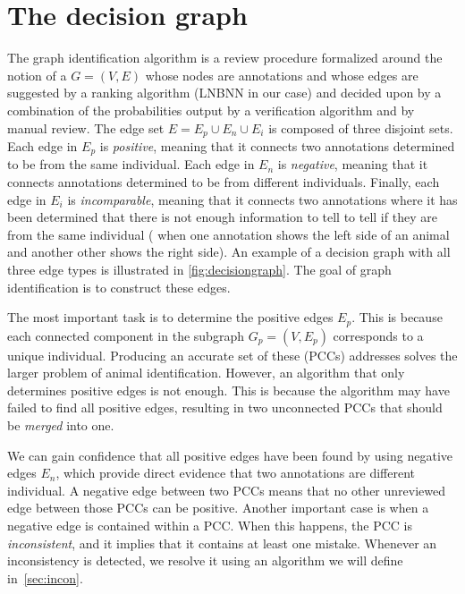 \section{The decision graph}\label{sec:decisiongraph}

\decisiongraph{}

The graph identification algorithm is a review procedure formalized around the notion of a  $G = (V, E)$ whose nodes are annotations and whose edges are suggested by a ranking algorithm (LNBNN in our
case) and decided upon by a combination of the probabilities output by a verification algorithm and by manual
review.  The edge set $E = E_p \cup E_n \cup E_i$ is composed of three disjoint sets. Each edge in $E_p$ is
\emph{positive}, meaning that it connects two annotations determined to be from the same individual. Each edge in
$E_n$ is \emph{negative}, meaning that it connects annotations determined to be from different individuals.
Finally, each edge in $E_i$ is \emph{incomparable}, meaning that it connects two annotations where it has been
determined that there is not enough information to tell to tell if they are from the same individual (\eg{} when
one annotation shows the left side of an animal and another other shows the right side).  An example of a decision
graph with all three edge types is illustrated in \cref{fig:decisiongraph}. The goal of graph identification is to
construct these edges.

The most important task is to determine the positive edges $E_p$.  This is because each connected component in the
subgraph $G_p = (V, E_p)$ corresponds to a unique individual.  Producing an accurate set of these
 (PCCs) addresses solves the larger problem of animal identification.
However, an algorithm that only determines positive edges is not enough.  This is because the algorithm may have
failed to find all positive edges, resulting in two unconnected PCCs that should be \emph{merged} into one.

We can gain confidence that all positive edges have been found by using negative edges $E_n$, which provide
  direct evidence that two annotations are different individual.
A negative edge between two PCCs means that no other unreviewed edge between those PCCs can be positive.
Another important case is when a negative edge is contained within a PCC.
When this happens, the PCC is \emph{inconsistent}, and it implies that it contains at least one mistake.
Whenever an inconsistency is detected, we resolve it using an algorithm we will define in~\cref{sec:incon}.

